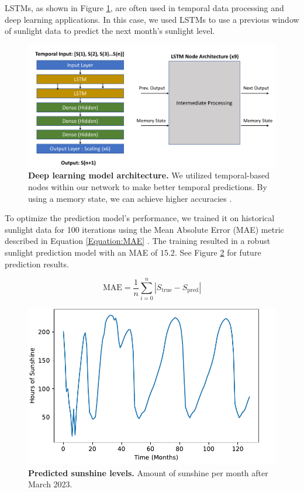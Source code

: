 \documentclass{mcmthesis}
\begin{document}
LSTMs, as shown in Figure \ref{fig:lstm}, are often used in temporal data processing and deep learning applications. In this case, we used LSTMs to use a previous window of sunlight data to predict the next month's sunlight level. 

\begin{figure}[!htbp]
    \centering
    \includegraphics[scale=0.5]{figures/lstm.pdf}
    \caption{\textbf{Deep learning model architecture.} We utilized temporal-based nodes within our network to make better temporal predictions. By using a memory state, we can achieve higher accuracies \cite{LSTM}.}
    \label{fig:lstm}
\end{figure}

To optimize the prediction model's performance, we trained it on historical sunlight data for 100 iterations using the Mean Absolute Error (MAE) metric described in Equation \ref{Equation:MAE} \cite{noauthor_cnyweathercom_nodate}. The training resulted in a robust sunlight prediction model with an MAE of $15.2$. See Figure \ref{fig:sunshinepredictionfigure} for future prediction results.

\begin{equation}
    \text{MAE} = \frac{1}{n} \sum_{i=0}^{n} \left| S_{\text{true}} - S_{\text{pred}}\right|
    \label{Equation:MAE}
\end{equation}

\begin{figure}[!htbp]
    \centering
    \includegraphics[scale=0.6]{figures/sunshineprediction.pdf}
    \caption{\textbf{Predicted sunshine levels.} Amount of sunshine per month after March 2023.}
    \label{fig:sunshinepredictionfigure}
\end{figure}
\end{document}
